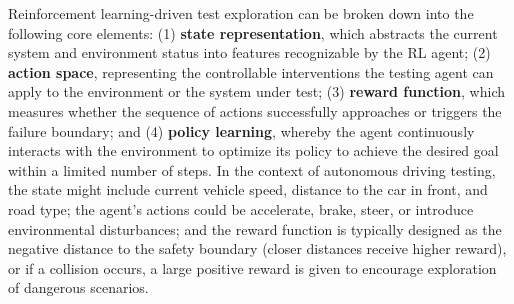 \documentclass[manuscript,screen,review]{acmart}
\begin{document}
Reinforcement learning-driven test exploration can be broken down into the following core elements: (1) \textbf{state representation}, which abstracts the current system and environment status into features recognizable by the RL agent; (2) \textbf{action space}, representing the controllable interventions the testing agent can apply to the environment or the system under test; (3) \textbf{reward function}, which measures whether the sequence of actions successfully approaches or triggers the failure boundary; and (4) \textbf{policy learning}, whereby the agent continuously interacts with the environment to optimize its policy to achieve the desired goal within a limited number of steps. In the context of autonomous driving testing, the state might include current vehicle speed, distance to the car in front, and road type; the agent’s actions could be accelerate, brake, steer, or introduce environmental disturbances; and the reward function is typically designed as the negative distance to the safety boundary (closer distances receive higher reward), or if a collision occurs, a large positive reward is given to encourage exploration of dangerous scenarios.
\end{document}
